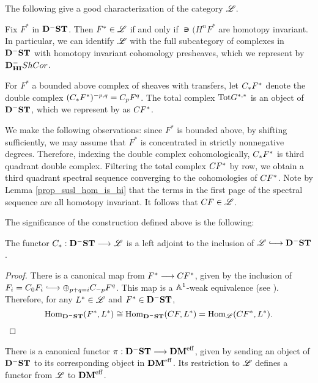 The following give a good characterization of the category 
$\ALocal$.

\begin{prop}
Fix $F^*$ in $\DShCor$. Then $F^* \in \ALocal$ if and only if
$\nis(H^n F^*$ are homotopy invariant. In particular, we can
identify $\ALocal$ with the full subcategory of complexes in 
$\DShCor$ with homotopy invariant cohomology presheaves, which we 
represent by $\DCat^-_{\HI} \ShCor$.
\end{prop}

\begin{defn}
For $F^*$ a bounded above complex of sheaves with transfers,
let $\suslC F^*$ denote the double complex $(\suslC F^*)^{-p, q} = 
\suslC[p] F^q$. The total complex $\Tot G^{*,*}$ is an object of 
$\DShCor$, which we represent by as $\suslC[] F^*$. 
\end{defn}

We make the following observations: since $F^*$ is bounded above,
by shifting sufficiently, we may assume that $F^*$ is concentrated
in strictly nonnegative degrees. Therefore, indexing the double
complex cohomologically, $\suslC F^*$ is third quadrant double 
complex. Filtering the total complex $\suslC[] F^*$ by row, we 
obtain a third quadrant spectral sequence converging to the 
cohomologies of $\suslC[] F^*$. Note by Lemma 
\ref{prop_susl_hom_is_hi} that the terms in the first page of the 
spectral sequence are all homotopy invariant. It follows that
$\suslC[] F \in \ALocal$.

The significance of the construction defined above is the 
following:

\begin{prop}
The functor $\suslC : \DShCor \to \ALocal$ is a left adjoint to
the inclusion of $\ALocal \into \DShCor$.
\end{prop}

\begin{proof}
There is a canonical map from $F^* \to \suslC[] F^*$,
given by the inclusion of $F_i = \suslC[0] F_i \into \oplus_{p + 
q = i} \suslC[-p] F^q$. This map is a $\A^1$-weak equivalence
(see \cite[Lemma 14.4]{MVW}). Therefore, for any $L^* \in \ALocal$
and $F^* \in \DShCor$,
\[
\hom_{\DShCor}(F^*, L^*) \cong \hom_{\DShCor}(\suslC[] F, L^*)
   = \hom_{\ALocal}(\suslC[] F^*, L^*).
\]
\end{proof}

There is a canonical functor $\pi: \DShCor \to \DMeff$, given
by sending an object of $\DShCor$ to its corresponding object in
$\DMeff$. Its restriction to $\ALocal$ defines a functor from
$\ALocal$ to $\DMeff$.

